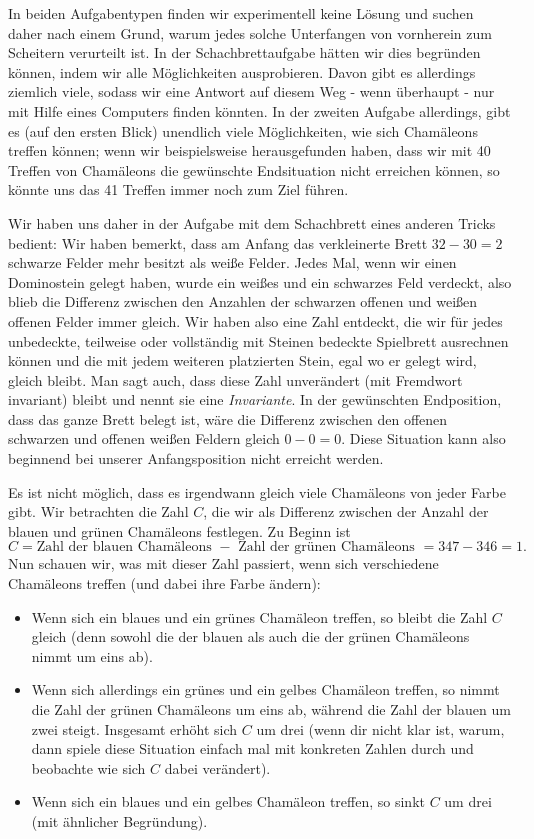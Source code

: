 \documentclass[a4paper,ngerman,12pt]{scrartcl}
\theoremstyle{definition}
\theoremstyle{plain}
\theoremstyle{remark}
\begin{document}
In beiden Aufgabentypen finden wir experimentell keine Lösung und suchen daher nach einem Grund, warum jedes solche Unterfangen von vornherein zum Scheitern verurteilt ist. In der Schachbrettaufgabe hätten wir dies begründen können, indem wir alle Möglichkeiten ausprobieren. Davon gibt es allerdings ziemlich viele, sodass wir eine Antwort auf diesem Weg - wenn überhaupt - nur mit Hilfe eines Computers finden könnten. In der zweiten Aufgabe allerdings, gibt es (auf den ersten Blick) unendlich viele Möglichkeiten, wie sich Chamäleons treffen können; wenn wir beispielsweise herausgefunden haben, dass wir mit 40 Treffen von Chamäleons die gewünschte Endsituation nicht erreichen können, so könnte uns das 41 Treffen immer noch zum Ziel führen.

Wir haben uns daher in der Aufgabe mit dem Schachbrett eines anderen Tricks bedient: Wir haben bemerkt, dass am Anfang das verkleinerte Brett $32 - 30 = 2$ schwarze Felder mehr besitzt als weiße Felder. Jedes Mal, wenn wir einen Dominostein gelegt haben, wurde ein weißes und ein schwarzes Feld verdeckt, also blieb die Differenz zwischen den Anzahlen der schwarzen offenen und weißen offenen Felder immer gleich. Wir haben also eine Zahl entdeckt, die wir für jedes unbedeckte, teilweise oder vollständig mit Steinen bedeckte Spielbrett ausrechnen können und die mit jedem weiteren platzierten Stein, egal wo er gelegt wird, gleich bleibt. Man sagt auch, dass diese Zahl unverändert (mit Fremdwort invariant) bleibt und nennt sie eine \emph{Invariante}. In der gewünschten Endposition, dass das ganze Brett belegt ist, wäre die Differenz zwischen den offenen schwarzen und offenen weißen Feldern gleich $0 - 0 = 0$. Diese Situation kann also beginnend bei unserer Anfangsposition nicht erreicht werden.

Es ist nicht möglich, dass es irgendwann gleich viele Chamäleons von jeder Farbe gibt. Wir betrachten die Zahl $C$, die wir als Differenz zwischen der Anzahl der blauen und grünen Chamäleons festlegen. Zu Beginn ist
	\[C = \text{Zahl der blauen Chamäleons } - \text{ Zahl der grünen Chamäleons } = 347 - 346 = 1.\]
Nun schauen wir, was mit dieser Zahl passiert, wenn sich verschiedene Chamäleons treffen (und dabei ihre Farbe ändern):
\begin{itemize}
	\item Wenn sich ein blaues und ein grünes Chamäleon treffen, so bleibt die Zahl $C$ gleich (denn sowohl die der blauen als auch die der grünen Chamäleons nimmt um eins ab).
	\item Wenn sich allerdings ein grünes und ein gelbes Chamäleon treffen, so nimmt die Zahl der grünen Chamäleons um eins ab, während die Zahl der blauen um zwei steigt. Insgesamt erhöht sich $C$ um drei (wenn dir nicht klar ist, warum, dann spiele diese Situation einfach mal mit konkreten Zahlen durch und beobachte wie sich $C$ dabei verändert).
	\item Wenn sich ein blaues und ein gelbes Chamäleon treffen, so sinkt $C$ um drei (mit ähnlicher Begründung).
\end{itemize}
\end{document}
